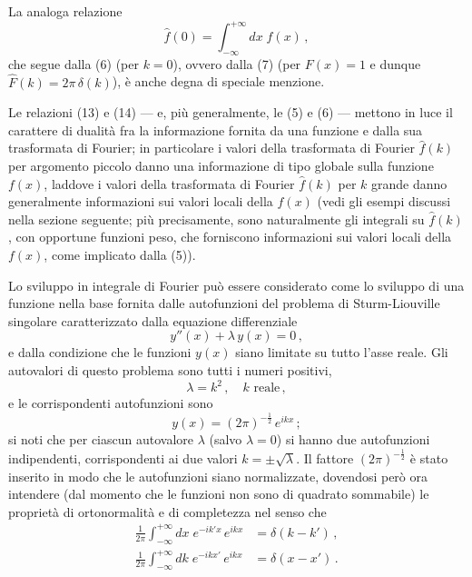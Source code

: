 \documentclass[11pt, a4paper]{book}
\numberwithin{equation}{section}
\begin{document}
La analoga relazione
\begin{equation}
  \hat{f}(0) = \int_{-\infty}^{+\infty} dx\;f(x)\,, \tag{14}
\end{equation}
che segue dalla (6) (per $k=0$), ovvero dalla (7) (per $F(x)=1$ e dunque $\hat{F}(k)=2\pi\,\delta(k)$), è anche degna di speciale menzione.

Le relazioni (13) e (14) --- e, più generalmente, le (5) e (6) --- mettono in luce il carattere di dualità fra la informazione fornita da una funzione e dalla sua trasformata di Fourier; in particolare i valori della trasformata di Fourier $\hat{f}(k)$ per argomento piccolo danno una informazione di tipo globale sulla funzione $f(x)$, laddove i valori della trasformata di Fourier $\hat{f}(k)$ per $k$ grande danno generalmente informazioni sui valori locali della $f(x)$ (vedi gli esempi discussi nella sezione seguente; più precisamente, sono naturalmente gli integrali su $\hat{f}(k)$, con opportune funzioni peso, che forniscono informazioni sui valori locali della $f(x)$, come implicato dalla (5)).

Lo sviluppo in integrale di Fourier può essere considerato come lo sviluppo di una funzione nella base fornita dalle autofunzioni del problema di Sturm-Liouville singolare caratterizzato dalla equazione differenziale
\begin{equation}
  y''(x) + \lambda\,y(x) = 0\,, \tag{15}
\end{equation}
e dalla condizione che le funzioni $y(x)$ siano limitate su tutto l'asse reale. Gli autovalori di questo problema sono tutti i numeri positivi,
\begin{equation}
  \lambda = k^2\,,\quad k \text{ reale}\,, \tag{16}
\end{equation}
e le corrispondenti autofunzioni sono
\begin{equation}
  y(x) = (2\pi)^{-\frac{1}{2}}\,e^{ikx}\,; \tag{17}
\end{equation}
si noti che per ciascun autovalore $\lambda$ (salvo $\lambda=0$) si hanno due autofunzioni indipendenti, corrispondenti ai due valori $k=\pm\sqrt{\lambda}$. Il fattore $(2\pi)^{-\frac{1}{2}}$ è stato inserito in modo che le autofunzioni siano normalizzate, dovendosi però ora intendere (dal momento che le funzioni non sono di quadrato sommabile) le proprietà di ortonormalità e di completezza nel senso che
\begin{align}
  \frac{1}{2\pi}\int_{-\infty}^{+\infty} dx\;e^{-ik'x}\,e^{ikx} &= \delta(k-k')\,, \tag{18a}\\
  \frac{1}{2\pi}\int_{-\infty}^{+\infty} dk\;e^{-ikx'}\,e^{ikx} &= \delta(x-x')\,. \tag{18b}
\end{align}
\end{document}
